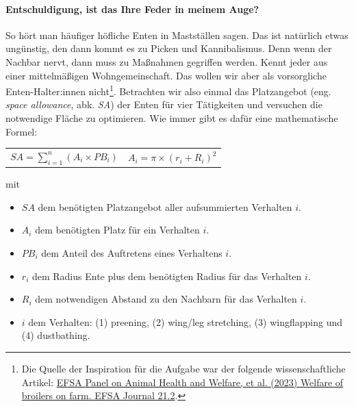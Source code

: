 \documentclass[a4paper, 9pt]{scrartcl}\usepackage[]{graphicx}\usepackage[]{xcolor}
\begin{document}
\paragraph{Entschuldigung, ist das Ihre Feder in meinem Auge?}



So h{\"o}rt man h{\"a}ufiger h{\"o}fliche Enten in Mastst{\"a}llen sagen. Das
ist nat{\"u}rlich etwas ung{\"u}nstig, den dann kommt es zu Picken und
Kannibalismus. Denn wenn der Nachbar nervt, dann muss zu Ma{\ss}nahmen
gegriffen werden. Kennt jeder aus einer mittelm{\"a}{\ss}igen Wohngemeinschaft. Das
wollen wir aber als vorsorgliche Enten-Halter:innen
nicht\footnote{Die Quelle der Inspiration f{\"u}r die Aufgabe war der folgende
  wissenschaftliche Artikel:
  \href{https://www.efsa.europa.eu/en/efsajournal/pub/7788}{EFSA Panel on
    Animal Health and Welfare, et al. (2023) Welfare of broilers on
    farm. EFSA Journal 21.2}.}. Betrachten wir also einmal das Platzangebot
(eng. \textit{space allowance}, abk. \textit{SA}) der Enten
f{\"u}r vier T{\"a}tigkeiten und versuchen die notwendige Fl{\"a}che zu optimieren. Wie
immer gibt es daf{\"u}r eine mathematische Formel:


\begin{center}
  \begin{tabular}{cc}
    $SA = \sum^n_{i = 1} (A_i \times PB_i)$ & $A_i = \pi \times (r_i + R_i)^2$\\
  \end{tabular}
\end{center}

\vspace{-2Ex}

mit

\begin{itemize}[noitemsep]
\item $SA$ dem ben{\"o}tigten Platzangebot aller aufsummierten Verhalten $i$.
\item $A_i$ dem ben{\"o}tigten Platz f{\"u}r ein Verhalten $i$. 
\item $PB_i$ dem Anteil des Auftretens eines Verhaltens $i$.
\item $r_i$ dem Radius Ente plus dem ben{\"o}tigten Radius f{\"u}r das Verhalten $i$.
\item $R_i$ dem notwendigen Abstand zu den Nachbarn f{\"u}r das Verhalten $i$.    
\item $i$ dem Verhalten: (1) preening, (2) wing/leg stretching, (3)
  wingflapping und (4) dustbathing.
\end{itemize}
\end{document}

